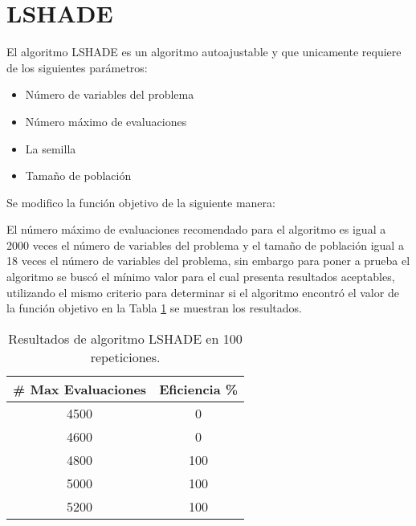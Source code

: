 \documentclass[conference]{IEEEtran}
\begin{document}
\section{LSHADE}

El algoritmo LSHADE es un algoritmo autoajustable y que unicamente requiere de los siguientes parámetros:

\begin{itemize}
\item Número de variables del problema
\item Número máximo de evaluaciones 
\item La semilla
\item Tamaño de población
\end{itemize}

Se modifico la función objetivo de la siguiente manera: 




El número máximo de evaluaciones recomendado para el algoritmo es igual a 2000 veces el número de variables del problema y el tamaño de población igual a 18 veces el número de variables del problema, sin embargo para poner a prueba el algoritmo se buscó el mínimo valor para el cual presenta resultados aceptables, utilizando el mismo criterio para determinar si el algoritmo encontró el valor de la función objetivo en la Tabla \ref{tab:LSHADE} se muestran los resultados.

\begin{table}[h!]   
	\caption{Resultados de algoritmo LSHADE en 100 repeticiones.}                                                                                                                
		\centering                                       
		\begin{tabular}{cc}
			\hline                                             
			\#{} Max Evaluaciones & Eficiencia \% \\                     
			\hline 
			4500 & 0\\                                            
			4600 & 0\\
			4800 & 100\\
			5000 & 100\\
			5200 & 100\\
			\hline                                             
		\end{tabular}
		\label{tab:LSHADE}
	\end{table}	
\end{document}
